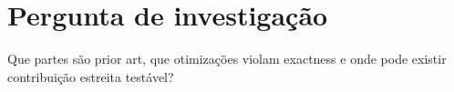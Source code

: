 \section{Pergunta de investigação}
Que partes são prior art, que otimizações violam exactness e onde pode existir contribuição estreita testável?
